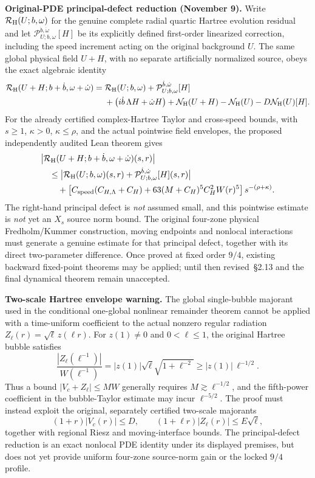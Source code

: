 \documentclass[11pt]{amsart}
\begin{document}
\medskip
\noindent\textbf{Original-PDE principal-defect reduction (November 9).}
Write $\mathcal R_{\rm H}(U;b,\omega)$ for the genuine complete
radial quartic Hartree evolution residual and let
$\mathcal P_{U;b,\omega}^{\dot b,\dot\omega}[H]$ be its explicitly
defined first-order linearized correction, including the speed
increment acting on the original background $U$.  The same global
physical field $U+H$, with no separate artificially normalized source,
obeys the exact algebraic identity
\[
\begin{aligned}
 \mathcal R_{\rm H}(U+H;b+\dot b,\omega+\dot\omega)
   ={}&
   \mathcal R_{\rm H}(U;b,\omega)
   +\mathcal P_{U;b,\omega}^{\dot b,\dot\omega}[H]\\
   &+\bigl(i\dot b\,\Lambda H+\dot\omega H\bigr)
    +\mathcal N_{\rm H}(U+H)-\mathcal N_{\rm H}(U)
      -D\mathcal N_{\rm H}(U)[H].
\end{aligned}
\]
For the already certified complex-Hartree Taylor and cross-speed
bounds, with $s\ge1$, $\kappa>0$, $\kappa\le\rho$, and the actual
pointwise field envelopes, the proposed independently audited
Lean theorem gives
\[
\begin{aligned}
 &\bigl|\mathcal R_{\rm H}(U+H;b+\dot b,\omega+\dot\omega)(s,r)\bigr|\\
 &\quad\le
 \bigl|\mathcal R_{\rm H}(U;b,\omega)(s,r)
       +\mathcal P_{U;b,\omega}^{\dot b,\dot\omega}[H](s,r)\bigr|\\
 &\qquad+
 \left[
   C_{\rm speed}(C_{H,\Lambda}+C_H)
   +63(M+C_H)^5C_H^2W(r)^5
 \right]s^{-(\rho+\kappa)} .
\end{aligned}
\]
The right-hand principal defect is \emph{not} assumed small, and this
pointwise estimate is \emph{not} yet an $X_s$ source norm bound.
The original four-zone physical Fredholm/Kummer construction, moving
endpoints and nonlocal interactions must generate a genuine estimate
for that principal defect, together with its direct two-parameter
difference.  Once proved at fixed order $9/4$, existing backward
fixed-point theorems may be applied; until then revised~\S2.13
and the final dynamical theorem remain unaccepted.


\medskip
\noindent\textbf{Two-scale Hartree envelope warning.}
The global single-bubble majorant used in the conditional one-global
nonlinear remainder theorem cannot be applied with a time-uniform
coefficient to the actual nonzero regular radiation
$Z_\ell(r)=\sqrt{\ell}\,z(\ell r)$.  For $z(1)\ne0$ and
$0<\ell\le1$, the original Hartree bubble satisfies
\[
 \frac{|Z_\ell(\ell^{-1})|}{W(\ell^{-1})}
  = |z(1)|\sqrt{\ell}\sqrt{1+\ell^{-2}}
  \ge |z(1)|\,\ell^{-1/2}.
\]
Thus a bound $|V_c+Z_\ell|\le M W$ generally requires
$M\gtrsim\ell^{-1/2}$, and the fifth-power coefficient in the
bubble-Taylor estimate may incur $\ell^{-5/2}$.  The proof must
instead exploit the original, separately certified two-scale
majorants
\[
 (1+r)|V_c(r)|\le D,\qquad
 (1+\ell r)|Z_\ell(r)|\le E\sqrt{\ell},
\]
together with regional Riesz and moving-interface bounds.
The principal-defect reduction is an exact nonlocal PDE identity
under its displayed premises, but does not yet provide uniform
four-zone source-norm gain or the locked $9/4$ profile.
\end{document}
